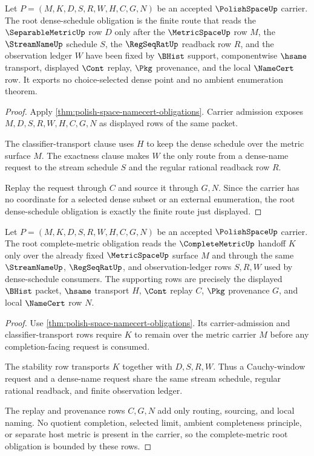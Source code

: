 \begin{theorem}
\label{thm:polishspace-dense-schedule-root-obligation}
Let $P=(M,K,D,S,R,W,H,C,G,N)$ be an accepted $\PolishSpaceUp$ carrier. The
root dense-schedule obligation is the finite route that reads the
$\SeparableMetricUp$ row $D$ only after the $\MetricSpaceUp$ row $M$, the
$\StreamNameUp$ schedule $S$, the $\RegSeqRatUp$ readback row $R$, and the
observation ledger $W$ have been fixed by $\BHist$ support, componentwise
$\hsame$ transport, displayed $\Cont$ replay, $\Pkg$ provenance, and the
local $\NameCert$ row. It exports no choice-selected dense point and no
ambient enumeration theorem.
\end{theorem}
\begin{proof}
Apply \autoref{thm:polish-space-namecert-obligations}. Carrier admission
exposes $M,D,S,R,W,H,C,G,N$ as displayed rows of the same packet.

The classifier-transport clause uses $H$ to keep the dense schedule over the
metric surface $M$. The exactness clause makes $W$ the only route from a
dense-name request to the stream schedule $S$ and the regular rational
readback row $R$.

Replay the request through $C$ and source it through $G,N$. Since the carrier
has no coordinate for a selected dense subset or an external enumeration, the
root dense-schedule obligation is exactly the finite route just displayed.
\end{proof}

\begin{theorem}
\label{thm:polishspace-complete-metric-root-obligation}
Let $P=(M,K,D,S,R,W,H,C,G,N)$ be an accepted $\PolishSpaceUp$ carrier. The
root complete-metric obligation reads the $\CompleteMetricUp$ handoff $K$
only over the already fixed $\MetricSpaceUp$ surface $M$ and through the same
$\StreamNameUp$, $\RegSeqRatUp$, and observation-ledger rows $S,R,W$ used by
dense-schedule consumers. The supporting rows are precisely the displayed
$\BHist$ packet, $\hsame$ transport $H$, $\Cont$ replay $C$, $\Pkg$
provenance $G$, and local $\NameCert$ row $N$.
\end{theorem}
\begin{proof}
Use \autoref{thm:polish-space-namecert-obligations}. Its carrier-admission
and classifier-transport rows require $K$ to remain over the metric carrier
$M$ before any completion-facing request is consumed.

The stability row transports $K$ together with $D,S,R,W$. Thus a Cauchy-window
request and a dense-name request share the same stream schedule, regular
rational readback, and finite observation ledger.

The replay and provenance rows $C,G,N$ add only routing, sourcing, and local
naming. No quotient completion, selected limit, ambient completeness
principle, or separate host metric is present in the carrier, so the
complete-metric root obligation is bounded by these rows.
\end{proof}

